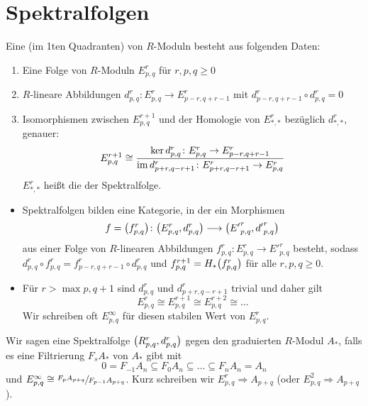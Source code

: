 \section{Spektralfolgen} %
\label{sec:14}
\begin{definition}[{name=[homologische Spektralfolge]}]
	Eine  (im 1ten Quadranten) von $R$-Moduln besteht aus folgenden Daten:
	\begin{enumerate}[1.]
		\item Eine Folge von $R$-Moduln $E^r_{p,q}$ für $r,p,q\ge 0$
		\item $R$-lineare Abbildungen $d^r_{p,q} \colon E_{p,q}^r \to E^r_{p-r,q+r-1}$ mit $d^r_{p-r,q+r-1} \circ d^r_{p,q}=0$
		\item Isomorphismen zwischen $E^{r+1}_{p,q}$ und der Homologie von $E^r_{*,*}$ bezüglich $d^r_{*,*}$, genauer:
		\[
			E^{r+1}_{p,q} \cong \frac{\ker d^r_{p,q} \colon E^r_{p,q} \to E^r_{p-r,q+r-1}}{\im d^r_{p+r,q-r+1} \colon E^r_{p+r,q-r+1} \to E^r_{p,q}}
		\]
		$E^r_{*,*}$ heißt die  der Spektralfolge.
	\end{enumerate}
\end{definition}

\begin{bemerkung}
	\leavevmode
	\begin{itemize}
		\item Spektralfolgen bilden eine Kategorie, in der ein Morphismen 
		\[
			f = \enbrace*{f^r_{p,q}} \colon \enbrace*{E^r_{p,q},d^r_{p,q}} \longrightarrow \enbrace*{{E'}^r_{p,q},{d'}^r_{p,q}}
		\]
		aus einer Folge von $R$-linearen Abbildungen $f^r_{p,q} \colon E^r_{p,q} \to {E'}^r_{p,q}$ besteht, sodass $d^r_{p,q} \circ f^r_{p,q} = f^r_{p-r,q+r-1} \circ d^r_{p,q}$ und $f^{r+1}_{p,q} = H_* \enbrace*{f^r_{p,q}}$ für alle $r,p,q\ge 0$.
		\item Für $r > \max{p,q+1}$ sind $d^r_{p,q}$ und $d^r_{p+r,q-r+1}$ trivial und daher gilt 
		\[
			E^r_{p,q} \cong E^{r+1}_{p,q} \cong E^{r+2}_{p,q} \cong \ldots
		\]
		Wir schreiben oft $E^\infty_{p,q}$ für diesen stabilen Wert von $E^r_{p,q}$.
	\end{itemize}
\end{bemerkung}

\begin{definition}[{name=[konvergente Spektralfolge]}]
	Wir sagen eine Spektralfolge $\enbrace*{R^r_{p,q},d^r_{p,q}}$  gegen den graduierten $R$-Modul $A_*$, falls es eine Filtrierung $F_s A_*$ von $A_*$ gibt mit
	\[
		0 = F_{-1}A_n \subseteq F_0 A_n \subseteq \ldots \subseteq F_n A_n = A_n
	\]
	und $E^\infty_{p,q} \cong \sfrac{F_p A_{p+q}}{F_{p-1}A_{p+q}}$.
	Kurz schreiben wir $E_{p,q}^r \Rightarrow A_{p+q}$ (oder $E^2_{p,q}\Rightarrow A_{p+q}$).
\end{definition}

